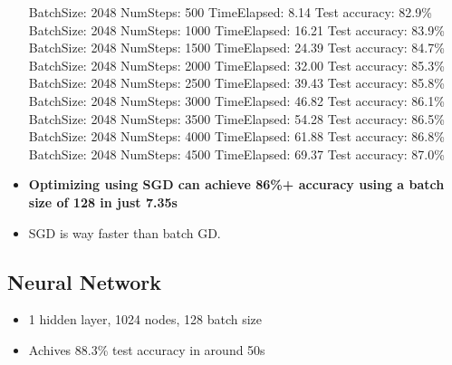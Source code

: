 \documentclass{article}
\begin{document}
\begin{itemize}
BatchSize: 2048 NumSteps: 500 TimeElapsed: 8.14 Test accuracy: 82.9\% \\
BatchSize: 2048 NumSteps: 1000 TimeElapsed: 16.21 Test accuracy: 83.9\% \\
BatchSize: 2048 NumSteps: 1500 TimeElapsed: 24.39 Test accuracy: 84.7\% \\
BatchSize: 2048 NumSteps: 2000 TimeElapsed: 32.00 Test accuracy: 85.3\% \\
BatchSize: 2048 NumSteps: 2500 TimeElapsed: 39.43 Test accuracy: 85.8\% \\
BatchSize: 2048 NumSteps: 3000 TimeElapsed: 46.82 Test accuracy: 86.1\% \\
BatchSize: 2048 NumSteps: 3500 TimeElapsed: 54.28 Test accuracy: 86.5\% \\
BatchSize: 2048 NumSteps: 4000 TimeElapsed: 61.88 Test accuracy: 86.8\% \\
BatchSize: 2048 NumSteps: 4500 TimeElapsed: 69.37 Test accuracy: 87.0\% \\

\item \textbf{Optimizing using SGD can achieve 86\%+ accuracy using a batch size of 128 in just 7.35s}

\item SGD is way faster than batch GD. 

\end{itemize}

\subsection{Neural Network}
\begin{itemize}
	\item 1 hidden layer, 1024 nodes, 128 batch size
	\item Achives 88.3\% test accuracy in around 50s
\end{itemize}
\end{document}
